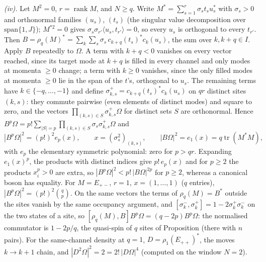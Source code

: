 \emph{(iv).} Let $M^{2} = 0$, $r = \operatorname{rank}M$, and $N \ge q$. Write $M^{*} = \sum_{s=1}^{r}\sigma_{s}t_{s}u_{s}^{*}$ with $\sigma_{s} > 0$ and orthonormal families $(u_{s})$, $(t_{s})$ (the singular value decomposition over $\mathrm{span}\{1, J\}$); $M^{*2} = 0$ gives $\sigma_{s}\sigma_{r'}\langle u_{s}, t_{r'}\rangle = 0$, so every $u_{s}$ is orthogonal to every $t_{r'}$. Then $B = \rho_{q}(M)^{*} = \sum_{k}\sum_{s}\sigma_{s}\,c_{k+q}(t_{s})^{*}c_{k}(u_{s})$, the sum over $k, k + q \in I$. Apply $B$ repeatedly to $\Omega$. A term with $k + q < 0$ vanishes on every vector reached, since its target mode at $k + q$ is filled in every channel and only modes at momenta $\ge 0$ change; a term with $k \ge 0$ vanishes, since the only filled modes at momenta $\ge 0$ lie in the span of the $t$'s, orthogonal to $u_{s}$. The remaining terms have $k \in \{-q, \dots, -1\}$ and define $\sigma_{k,s}^{+} = c_{k+q}(t_{s})^{*}c_{k}(u_{s})$ on $qr$ distinct sites $(k, s)$: they commute pairwise (even elements of distinct modes) and square to zero, and the vectors $\prod_{(k,s)\in S}\sigma_{k,s}^{+}\Omega$ for distinct sets $S$ are orthonormal. Hence $B^{p}\Omega = p!\sum_{|S| = p}\prod_{(k,s)\in S}\sigma_{s}\sigma_{k,s}^{+}\Omega$ and
\[
|B^{p}\Omega|^{2} = (p!)^{2}e_{p}(x), \qquad x = (\sigma_{s}^{2})_{(k,s)}, \qquad |B\Omega|^{2} = e_{1}(x) = q\operatorname{tr}(M^{*}M),
\]
with $e_{p}$ the elementary symmetric polynomial: zero for $p > qr$. Expanding $e_{1}(x)^{p}$, the products with distinct indices give $p!\,e_{p}(x)$ and for $p \ge 2$ the products $x_{i}^{p} > 0$ are extra, so $|B^{p}\Omega|^{2} < p!\,|B\Omega|^{2p}$ for $p \ge 2$, whereas a canonical boson has equality. For $M = E_{+-}$, $r = 1$, $x = (1, \dots, 1)$ ($q$ entries), $|B^{p}\Omega|^{2} = (p!)^{2}\binom{q}{p}$. On the same vectors the terms of $\rho_{q}(M) = B^{*}$ outside the sites vanish by the same occupancy argument, and $[\sigma_{k}^{-}, \sigma_{k}^{+}] = 1 - 2\sigma_{k}^{+}\sigma_{k}^{-}$ on the two states of a site, so $[\rho_{q}(M), B]B^{p}\Omega = (q - 2p)B^{p}\Omega$: the normalised commutator is $1 - 2p/q$, the quasi-spin of $q$ sites of Proposition  (there with $n$ pairs). For the same-channel density at $q = 1$, $D = \rho_{1}(E_{++})^{*}$, the moves $k \to k + 1$ chain, and $|D^{2}\Omega|^{2} = 2 = 2!\,|D\Omega|^{4}$ (computed on the window $N = 2$).

